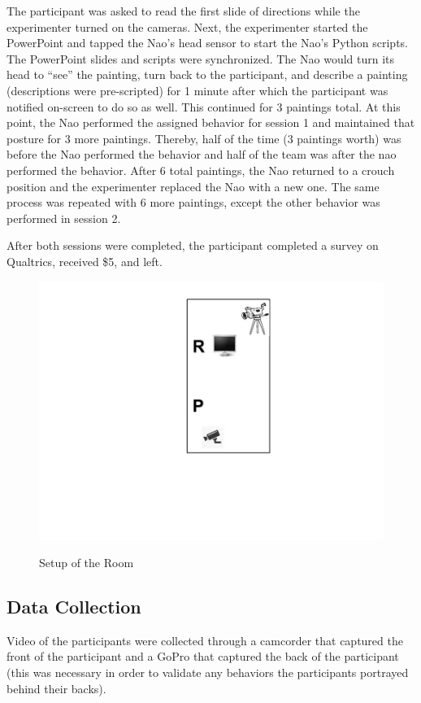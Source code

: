 \documentclass{acm_proc_article-sp}
\begin{document}
The participant was asked to read the first slide of directions while the experimenter turned on the cameras. Next, the experimenter started the PowerPoint and tapped the Nao's head sensor to start the Nao's Python scripts. The PowerPoint slides and scripts were synchronized. The Nao would turn its head to ``see'' the painting, turn back to the participant, and describe a painting (descriptions were pre-scripted) for 1 minute after which the participant was notified on-screen to do so as well. This continued for 3 paintings total. At this point, the Nao performed the assigned behavior for session 1 and maintained that posture for 3 more paintings. Thereby, half of the time (3 paintings worth) was before the Nao performed the behavior and half of the team was after the nao performed the behavior. After 6 total paintings, the Nao returned to a crouch position and the experimenter replaced the Nao with a new one. The same process was repeated with 6 more paintings, except the other behavior was performed in session 2. 

After both sessions were completed, the participant completed a survey on Qualtrics, received \$5, and left.

\begin{figure}[t!]
\centering
 \includegraphics[width=1.05\linewidth]{images/setup.jpg}\\
 \caption{Setup of the Room}
 \label{setup} %
\end{figure}

\subsection{Data Collection}
Video of the participants were collected through a camcorder that captured the front of the participant and a GoPro that captured the back of the participant (this was necessary in order to validate any behaviors the participants portrayed behind their backs).
\end{document}
